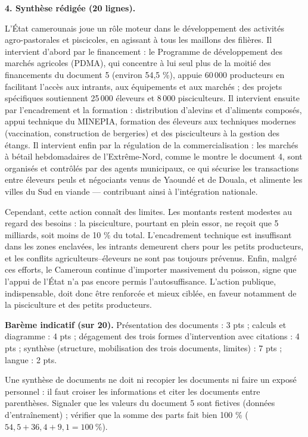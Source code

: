 \documentclass[11pt]{article}
\begin{document}
\begin{corrige}
\textbf{4. Synthèse rédigée (20 lignes).}

L'État camerounais joue un rôle moteur dans le développement des activités agro-pastorales et piscicoles, en agissant à tous les maillons des filières. Il intervient d'abord par le financement : le Programme de développement des marchés agricoles (PDMA), qui concentre à lui seul plus de la moitié des financements du document 5 (environ 54,5 \%), appuie 60\,000 producteurs en facilitant l'accès aux intrants, aux équipements et aux marchés ; des projets spécifiques soutiennent 25\,000 éleveurs et 8\,000 pisciculteurs. Il intervient ensuite par l'encadrement et la formation : distribution d'alevins et d'aliments composés, appui technique du MINEPIA, formation des éleveurs aux techniques modernes (vaccination, construction de bergeries) et des pisciculteurs à la gestion des étangs. Il intervient enfin par la régulation de la commercialisation : les marchés à bétail hebdomadaires de l'Extrême-Nord, comme le montre le document 4, sont organisés et contrôlés par des agents municipaux, ce qui sécurise les transactions entre éleveurs peuls et négociants venus de Yaoundé et de Douala, et alimente les villes du Sud en viande — contribuant ainsi à l'intégration nationale.

Cependant, cette action connaît des limites. Les montants restent modestes au regard des besoins : la pisciculture, pourtant en plein essor, ne reçoit que 5 milliards, soit moins de 10 \% du total. L'encadrement technique est insuffisant dans les zones enclavées, les intrants demeurent chers pour les petits producteurs, et les conflits agriculteurs--éleveurs ne sont pas toujours prévenus. Enfin, malgré ces efforts, le Cameroun continue d'importer massivement du poisson, signe que l'appui de l'État n'a pas encore permis l'autosuffisance. L'action publique, indispensable, doit donc être renforcée et mieux ciblée, en faveur notamment de la pisciculture et des petits producteurs.

\textbf{Barème indicatif (sur 20).} Présentation des documents : 3 pts ; calculs et diagramme : 4 pts ; dégagement des trois formes d'intervention avec citations : 4 pts ; synthèse (structure, mobilisation des trois documents, limites) : 7 pts ; langue : 2 pts.

\begin{attention}
Une synthèse de documents ne doit ni recopier les documents ni faire un exposé personnel : il faut croiser les informations et citer les documents entre parenthèses. Signaler que les valeurs du document 5 sont fictives (données d'entraînement) ; vérifier que la somme des parts fait bien 100 \% ($54,5 + 36,4 + 9,1 = 100\ \%$).
\end{attention}
\end{corrige}
\end{document}

